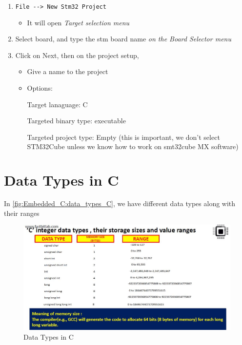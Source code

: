 \begin{enumerate}
    \item \verb|File --> New Stm32 Project| 
    
    \begin{itemize}
        \item It will open \textit{Target selection menu} 
    \end{itemize}
    
    \item Select board, and type the stm board name \textit{on the Board Selector menu}
    
    \item Click on Next, then on the project setup, 
    
    \begin{itemize}
        \item Give a name to the project
        
        \item Options: 
        
        Target lanaguage: C
        
        Targeted binary type: executable
        
        Targeted project type: Empty (this is important, we don't select STM32Cube unless we know how to work on smt32cube MX software)
    \end{itemize}
    
\end{enumerate}










\newpage
\section{Data Types in C}

In \autoref{fig:Embedded_C:data_types_C}, we have different data types along with their ranges

\begin{figure}[h]
\centering
\includegraphics[scale=0.5]{Figures/Embedded_C/data_types_C}
\caption{Data Types in C}
\label{fig:Embedded_C:data_types_C}
\end{figure}


